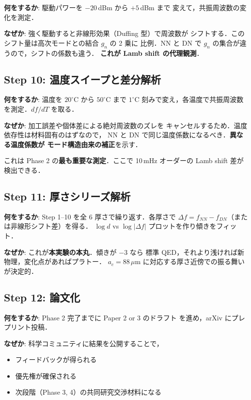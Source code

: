 \documentclass[11pt,a4paper]{article}
\begin{document}
\textbf{何をするか}: 駆動パワーを $-20$\,dBm から $+5$\,dBm まで
変えて，共振周波数の変化を測定．

\textbf{なぜか}: 強く駆動すると非線形効果（Duffing 型）で周波数が
シフトする．この シフト量は高次モードとの結合 $g_n$ の 2 乗に
比例．NN と DN で $g_n$ の集合が違うので，シフトの係数も違う．
\textbf{これが Lamb shift の代理観測}．

\subsection{Step 10: 温度スイープと差分解析}

\textbf{何をするか}: 温度を $20^\circ$C から $50^\circ$C まで $1^\circ$C
刻みで変え，各温度で共振周波数を測定．$df/dT$ を取る．

\textbf{なぜか}: 加工誤差や個体差による絶対周波数のズレを
キャンセルするため．温度依存性は材料固有のはずなので，
NN と DN で同じ温度係数になるべき．\textbf{異なる温度係数が
モード構造由来の補正}を示す．

これは Phase 2 の\textbf{最も重要な測定}．ここで 10\,mHz オーダーの
Lamb shift 差が検出できる．

\subsection{Step 11: 厚さシリーズ解析}

\textbf{何をするか}: Step 1--10 を全 6 厚さで繰り返す．各厚さで
$\Delta f = f_{NN} - f_{DN}$（または非線形シフト差）を得る．
$\log d$ vs $\log |\Delta f|$ プロットを作り傾きをフィット．

\textbf{なぜか}: これが\textbf{本実験の本丸}．傾きが $-3$ なら
標準 QED，それより浅ければ新物理，変化点があればプラトー．
$a_c = 88\,\mu$m に対応する厚さ近傍での振る舞いが決定的．

\subsection{Step 12: 論文化}

\textbf{何をするか}: Phase 2 完了までに Paper 2 or 3 のドラフト
を進め，arXiv にプレプリント投稿．

\textbf{なぜか}: 科学コミュニティに結果を公開することで，
\begin{itemize}
\item フィードバックが得られる
\item 優先権が確保される
\item 次段階（Phase 3, 4）の共同研究交渉材料になる
\end{itemize}
\end{document}
